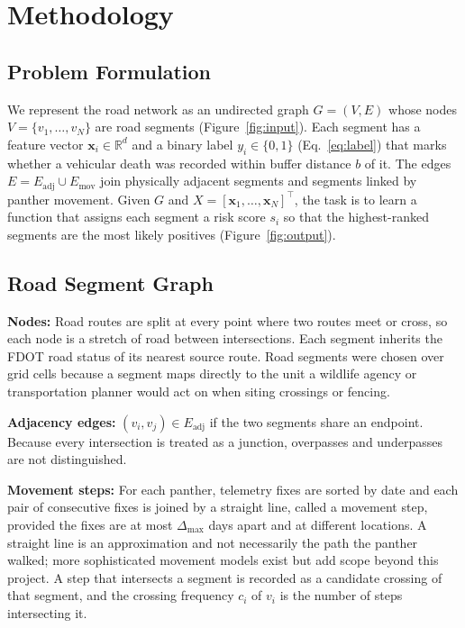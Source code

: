 \documentclass[letterpaper]{article}
\begin{document}
\section{Methodology}\subsection{Problem Formulation}
We represent the road network as an undirected graph $G = (V, E)$ whose nodes $V = \{v_1, \dots, v_N\}$ are road segments (Figure~\ref{fig:input}). Each segment has a feature vector $\mathbf{x}_i \in \mathbb{R}^d$ and a binary label $y_i \in \{0, 1\}$ (Eq.~\ref{eq:label}) that marks whether a vehicular death was recorded within buffer distance $b$ of it. The edges $E = E_{\mathrm{adj}} \cup E_{\mathrm{mov}}$ join physically adjacent segments and segments linked by panther movement. Given $G$ and $X = [\mathbf{x}_1, \dots, \mathbf{x}_N]^\top$, the task is to learn a function that assigns each segment a risk score $s_i$ so that the highest-ranked segments are the most likely positives (Figure~\ref{fig:output}).

\subsection{Road Segment Graph}

\textbf{Nodes:} Road routes are split at every point where two routes meet or
cross, so each node is a stretch of road between intersections. Each segment
inherits the FDOT road status of its nearest source route. Road segments were
chosen over grid cells because a segment maps directly to the unit a wildlife
agency or transportation planner would act on when siting crossings or
fencing.

\textbf{Adjacency edges:} $(v_i, v_j) \in E_{\mathrm{adj}}$ if the two
segments share an endpoint. Because every intersection is treated as a
junction, overpasses and underpasses are not distinguished.

\textbf{Movement steps:} For each panther, telemetry fixes are sorted by date
and each pair of consecutive fixes is joined by a straight line, called a
movement step, provided the fixes are at most $\Delta_{\max}$ days apart and
at different locations. A straight line is an approximation and not
necessarily the path the panther walked; more sophisticated movement models
exist but add scope beyond this project. A step that intersects a segment is
recorded as a candidate crossing of that segment, and the crossing frequency
$c_i$ of $v_i$ is the number of steps intersecting it.
\end{document}
